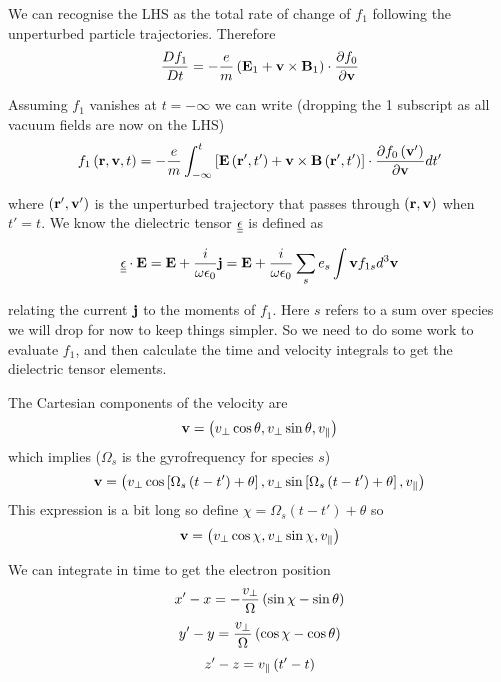 We can recognise the LHS as the total rate of change of $f_1$ following the unperturbed particle trajectories. Therefore
\begin{equation}
	\frac{D f_1}{D t} = -\frac{e}{m} \left(\textbf{E}_1 + \textbf{v} \times \textbf{B}_1\right) \cdot \frac{\partial f_0}{\partial \textbf{v}}
\end{equation}

Assuming $f_1$ vanishes at $t=-\infty$ we can write (dropping the 1 subscript as all vacuum fields are now on the LHS)
\begin{equation}
	f_1 \left(\textbf{r}, \textbf{v}, t\right) = -\frac{e}{m} \int_{-\infty}^t \left[\textbf{E} \left(\textbf{r}', t'\right) + \textbf{v} \times \textbf{B}\left(\textbf{r}', t'\right) \right] \cdot \frac{\partial f_0 \left(\textbf{v}'\right)}{\partial \textbf{v}} dt'
\end{equation}

where $\left(\textbf{r}', \textbf{v}'\right)$ is the unperturbed trajectory that passes through $\left(\textbf{r}, \textbf{v}\right)$ when $t'=t$. We know the dielectric tensor $\underline{\underline{\epsilon}}$ is defined as

\begin{equation}\label{dielectric_tensor_def_kinetic_theory}
	\underline{\underline{\epsilon}}\cdot\textbf{E} = \textbf{E} + \frac{i}{\omega \epsilon_0}\textbf{j} = \textbf{E} + \frac{i}{\omega \epsilon_0} \sum_s e_s \int \textbf{v} f_{1s} d^3 \textbf{v}
\end{equation}

relating the current $\textbf{j}$ to the moments of $f_1$. Here $s$ refers to a sum over species we will drop for now to keep things simpler. So we need to do some work to evaluate $f_1$, and then calculate the time and velocity integrals to get the dielectric tensor elements.

The Cartesian components of the velocity are
\begin{equation}
	\textbf{v} = \left(v_\perp\cos\theta, v_\perp\sin\theta, v_\parallel\right)
\end{equation}
which implies ($\Omega_s$ is the gyrofrequency for species $s$)
\begin{equation}
	\textbf{v} = \left(v_\perp\cos\left[\Omega_s\left(t-t'\right)+\theta\right], v_\perp\sin\left[\Omega_s\left(t-t'\right)+\theta\right], v_\parallel\right)
\end{equation}
This expression is a bit long so define $\chi =\Omega_s\left(t-t'\right)+\theta$ so
\begin{equation}
	\textbf{v} = \left(v_\perp\cos\chi, v_\perp\sin\chi, v_\parallel\right)
\end{equation}

We can integrate in time to get the electron position
\begin{equation}\label{electron_xposition}
	x'-x = -\frac{v_\perp}{\Omega}\left( \sin\chi - \sin\theta\right)
\end{equation}
\begin{equation}\label{electron_yposition}
	y'-y = \frac{v_\perp}{\Omega}\left( \cos\chi - \cos\theta\right)
\end{equation}
\begin{equation}\label{electron_zposition}
	z'-z=v_\parallel \left(t' - t\right)
\end{equation}

